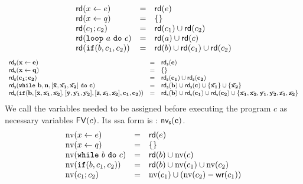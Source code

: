 \documentclass[a4paper,11pt]{article}
\begin{document}
\begin{defn}
\[\begin{array}{lll}
    \mathsf{rd} (\mathrel{ x \leftarrow e }) & =& \mathsf{rd} (e)  \\
    \mathsf{rd} (\mathrel{ x \leftarrow q }) & =&\{  \} \\
    \mathsf{rd} ( c_1; c_2  )  & = & \mathsf{rd} (c_1) \cup \mathsf{rd} (c_2) \\
    \mathsf{rd} (  \mathtt{loop} ~ a ~ \mathtt{do} ~ c  ) &= &\mathsf{rd} (a) \cup \mathsf{rd} (c) \\
    \mathsf{rd} (\mathtt{if}(b, c_1, c_2)) & =& \mathsf{rd} (b) \cup \mathsf{rd} (c_1) \cup \mathsf{rd} (c_2)\\
\end{array}
\]
\[
\begin{array}{lll}
    \mathsf{rd_s} (\mathbf{{\mathrel{ x \leftarrow e }}}) & =& \mathsf{rd_s} (\mathbf{{e}})  \\
    \mathsf{rd_s} (\mathbf{{\mathrel{ x \leftarrow q }}}) & =& \{  \} \\
    \mathsf{rd_s} ( \mathbf{{c_1; c_2}}  )  & = & \mathsf{rd_s} (\mathbf{{c_1}}) \cup \mathsf{rd_s} (\mathbf{{c_2}}) \\
    {\mathsf{rd_s} (  \mathtt{while} ~ \mathbf{{b, n, [\bar{x}, \bar{x_1}, \bar{x_2}] ~ \mathtt{do} ~ c}} )} 
    &= &
    \mathsf{rd_s} (\mathbf{{b}}) \cup \mathsf{rd_s} (\mathbf{{c}})  \cup \{ \mathbf{{\bar{x_1}}} \} \cup \{ \mathbf{{\bar{x_2}}} \}\\
    \mathsf{rd_s} (\mathtt{if}(\mathbf{{b,[\bar{x}, \bar{x_1}, \bar{x_2}], [\bar{y}, \bar{y_1}, \bar{y_2}],[\bar{z}, \bar{z_1}, \bar{z_2}], c_1, c_2}} )) & =& \mathsf{rd_s} (\mathbf{{b}}) \cup \mathsf{rd_s} (\mathbf{{c_1}}) \cup \mathsf{rd_s} (\mathbf{{c_2}}) \cup \{\mathbf{{\bar{x_1}, \bar{x_2},\bar{y_1}, \bar{y_2},\bar{z_1}, \bar{z_2} }}\}  \\
\end{array}
\]
{
We call the variables needed to be assigned before executing the program $c$ as necessary variables $\mathsf{FV} (c)$. Its ssa form is : $\mathsf{nv_s} (\mathbf{{c}})$.
}  
 \[
 \begin{array}{lll}
     \text{nv}(\mathrel{ x \leftarrow e } )  & = & \mathsf{rd} (e)  \\
     \text{nv}(\mathrel{ x \leftarrow q } )  & = & \{ \}  \\
     {\text{nv}(  \mathtt{while} ~ b ~ \mathtt{do} ~ c  ) }&= & \mathsf{rd} (b) \cup \text{nv}(c) \\
     \text{nv}(\mathtt{if}(b, c_1, c_2)) & =& \mathsf{rd} (b) \cup \text{nv}(c_1) \cup \text{nv}(c_2)  \\
      \text{nv}(c_1 ; c_2) & = & \text{nv}(c_1) \cup ( \text{nv}(c_2) - \mathsf{wr} (c_1))
 \end{array}
\]
\end{defn}
\end{document}
